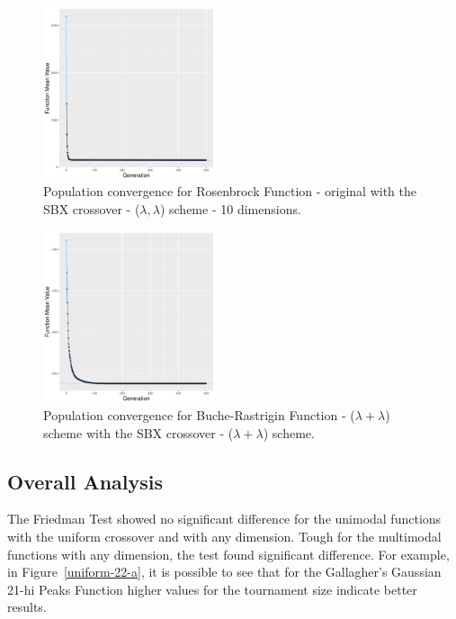 \begin{figure}[t]
	\includegraphics[width=0.45\textwidth]{img/covergency_unimodal_sbx_8_dim_10_tsize_9.pdf}
	\caption{Population convergence for Rosenbrock Function - original with the SBX crossover - ($\lambda, \lambda$) scheme -  10 dimensions.}
	\label{convergence-sbx-8-a}
\end{figure}


\begin{figure}[t]
	\includegraphics[width=0.45\textwidth]{img/covergency_multimodal_sbx_4_dim_10_tsize_5.pdf}
	\caption{Population convergence for Buche-Rastrigin Function - ($\lambda + \lambda$) scheme with the SBX crossover - ($\lambda + \lambda$) scheme.}
	\label{convegence-sbx-4-a}
\end{figure}


\subsection{Overall Analysis}

The Friedman Test showed no significant difference for the unimodal functions with the uniform crossover and with any dimension. Tough for the multimodal functions with any dimension, the test found significant difference. For example, in Figure~\ref{uniform-22-a}, it is possible to see that for the Gallagher's Gaussian 21-hi Peaks Function higher values for the tournament size indicate better results.

